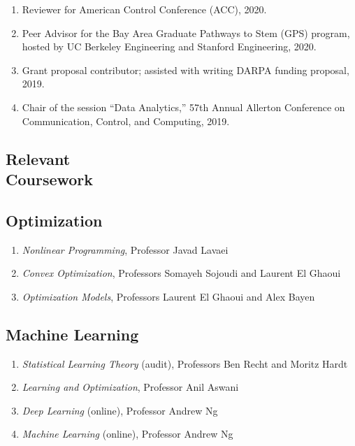 \documentclass[11pt]{article}
\newcommand{\subsectionskip}{\baselineskip}	%
\begin{document}
\begin{enumerate}[label={\arabic*.}]
		\item Reviewer for American Control Conference (ACC), 2020.
		\item Peer Advisor for the Bay Area Graduate Pathways to Stem (GPS) program, hosted by UC Berkeley Engineering and Stanford Engineering, 2020.
		\item Grant proposal contributor; assisted with writing DARPA funding proposal, 2019.
		\item Chair of the session ``Data Analytics,'' 57th Annual Allerton Conference on Communication, Control, and Computing, 2019.
	\end{enumerate}
	
	\begin{coursework}
		\section{\texorpdfstring{Relevant \\[\baselineskip] Coursework}{Relevant Coursework}}
		\hfill\vspace*{-2\baselineskip}
		
		\subsection{Optimization}
		\begin{enumerate}[label={\arabic*.}]
			\item \textit{Nonlinear Programming}, Professor Javad Lavaei
			\item \textit{Convex Optimization}, Professors Somayeh Sojoudi and Laurent El Ghaoui
			\item \textit{Optimization Models}, Professors Laurent El Ghaoui and Alex Bayen
		\end{enumerate}
		
		\vspace*{\subsectionskip}
		
		\subsection{Machine Learning}
		\begin{enumerate}[label=\arabic*.]
			\item \textit{Statistical Learning Theory} (audit), Professors Ben Recht and Moritz Hardt
			\item \textit{Learning and Optimization}, Professor Anil Aswani
			\item \textit{Deep Learning} (online), Professor Andrew Ng
			\item \textit{Machine Learning} (online), Professor Andrew Ng
		\end{enumerate}
		

\end{coursework}
\end{document}

